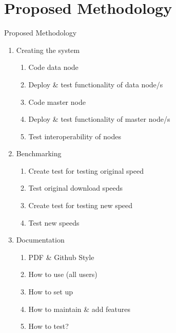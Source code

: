 \documentclass{beamer}
\begin{document}
\section{Proposed Methodology}
\begin{frame}{Proposed Methodology}
\begin{enumerate}

    \item Creating the system
    \begin{enumerate}
        \item Code data node
        \item Deploy \& test functionality of data node/s
        \item Code master node
        \item Deploy \& test functionality of master node/s
        \item Test interoperability of nodes
    \end{enumerate}
    \item Benchmarking
    \begin{enumerate}
        \item Create test for testing original speed
        \item Test original download speeds
        \item Create test for testing new speed
        \item Test new speeds
    \end{enumerate}
        \item Documentation
    \begin{enumerate}
        \item PDF \& Github Style
        \item How to use (all users)
        \item How to set up
        \item How to maintain \& add features
        \item How to test?
    \end{enumerate}
\end{enumerate}
\end{frame}



\end{document}
